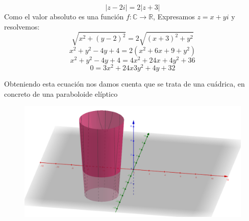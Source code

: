 \documentclass[12pt,a4paper,oneside,onecolumn]{article}
\begin{document}
    \newpage
    \section{}
    
    \[
        |z -2i| = 2|z + 3|
    \]
    Como el valor absoluto es una funci\'on $f: \mathbb{C} \longrightarrow \mathbb{R}$, Expresamos $z = x +yi$ y resolvemos:
    \[
        \sqrt{x^2+(y-2)^2} = 2\sqrt{(x+3)^2 + y^2}
     \]
     \[
        x^2+y^2-4y+4 = 2(x^2 +6x +9 + y^2)
     \]
     \[
        x^2+y^2-4y+4 = 4x^2 + 24x + 4y^2 +36
     \]
     \[
        0 = 3x^2 +24x 3y^2 +4y +32
     \] 

     Obteniendo esta ecuaci\'on nos damos cuenta que se trata de una cu\'adrica, en concreto de una paraboloide el\'iptico
     \begin{figure}[!h]
		\centering
		\includegraphics[scale=0.4]{ex4.png}
		\caption{}
		\label{fig:1}
	\end{figure}
    
\end{document}
